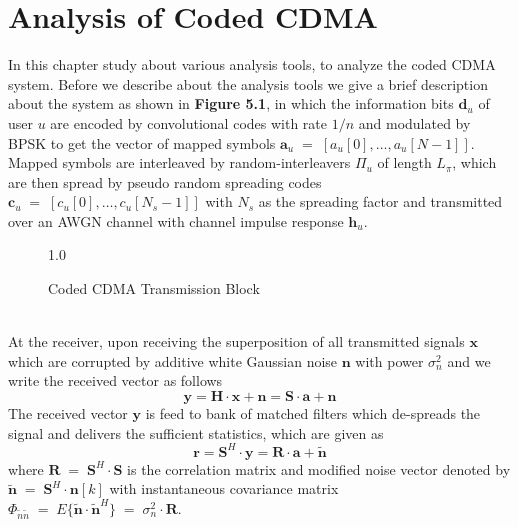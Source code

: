 \chapter{Analysis of Coded CDMA}
In this chapter study about various analysis tools, to analyze the coded CDMA system. Before we describe about the analysis tools we give a brief description about the system as shown in \textbf{Figure 5.1}, in which the information bits $\mathrm{\mathbf{d}}_u$ of user $u$ are encoded by convolutional codes with rate $1/n$ and modulated by BPSK to get the vector of mapped symbols $\mathrm{\mathbf{a}}_u\;=\;\left[a_u[0],\dots,a_u[N-1]\right]$. Mapped symbols are interleaved by random-interleavers $\Pi_u$ of length $L_\pi$, which are then spread by pseudo random spreading codes $\mathrm{\mathbf{c}}_u\;=\;\left[c_u[0],\dots,c_u[N_s-1]\right]$ with $N_s$ as the spreading factor and transmitted over an AWGN channel with channel impulse response $\mathrm{\mathbf{h}}_u$.
\begin{figure}[htb]
\centerline{  {1.0} }
\caption{Coded CDMA Transmission Block}
\end{figure}\\
At the receiver, upon receiving the superposition of all transmitted signals $\mathrm{\mathbf{x}}$ which are corrupted by additive white Gaussian noise $\mathrm{\mathbf{n}}$ with power $\sigma^2_n$ and we write the received vector as follows 
\begin{equation}
\mathrm{\mathbf{y}}=\mathrm{\mathbf{H}}\cdot\mathrm{\mathbf{x}}+\mathrm{\mathbf{n}}=\mathrm{\mathbf{S}}\cdot\mathrm{\mathbf{a}}+\mathrm{\mathbf{n}}
\end{equation}
The received vector $\mathrm{\mathbf{y}}$ is feed to bank of matched filters which de-spreads the signal and delivers the sufficient statistics, which are given as
\begin{equation}
\mathrm{\mathbf{r}}=\mathrm{\mathbf{S}}^H\cdot \mathrm{\mathbf{y}}=\mathrm{\mathbf{R}}\cdot\mathrm{\mathbf{a}}+\mathrm{\mathbf{\tilde{n}}}
\end{equation}
where $\mathrm{\mathbf{R}}\;=\;\mathrm{\mathbf{S}}^H\cdot\mathrm{\mathbf{S}}$ is the correlation matrix and modified noise vector denoted by $\mathrm{\mathbf{\tilde{n}}}\;=\;\mathrm{\mathbf{S}}^H\cdot\mathrm{\mathbf{n}}[k]$ with instantaneous covariance matrix $\Phi_{\tilde{n}\tilde{n}}\;=\;E\{\mathrm{\mathbf{\tilde{n}}}\cdot\mathrm{\mathbf{\tilde{n}}}^H\}\;=\;\sigma^2_n\cdot\mathrm{\mathbf{R}}$.\\ \\

